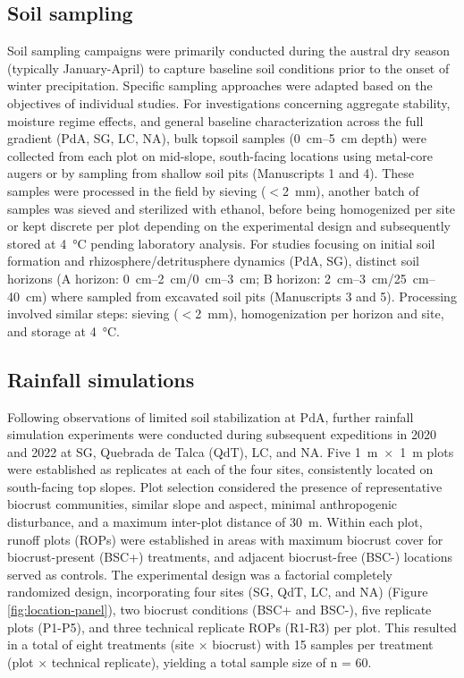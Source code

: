 \FloatBarrier

\subsection{Soil sampling}

Soil sampling campaigns were primarily conducted during the austral dry season (typically January-April) to capture baseline soil conditions prior to the onset of winter precipitation. Specific sampling approaches were adapted based on the objectives of individual studies. For investigations concerning aggregate stability, moisture regime effects, and general baseline characterization across the full gradient (PdA, SG, LC, NA), bulk topsoil samples (\SIrange{0}{5}{\centi\metre} depth) were collected from each plot on mid-slope, south-facing locations using metal-core augers or by sampling from shallow soil pits (Manuscripts 1 and 4). These samples were processed in the field by sieving ($<$\SI{2}{\milli\metre}), another batch of samples was sieved and sterilized with ethanol, before being homogenized per site or kept discrete per plot depending on the experimental design and subsequently stored at \SI{4}{\celsius} pending laboratory analysis. For studies focusing on initial soil formation and rhizosphere/detritusphere dynamics (PdA, SG), distinct soil horizons (A horizon: \SIrange{0}{2}{\centi\meter}/\SIrange{0}{3}{\centi\meter}; B horizon: \SIrange{2}{3}{\centi\meter}/\SIrange{25}{40}{\centi\meter}) where sampled from excavated soil pits (Manuscripts 3 and 5). Processing involved similar steps: sieving ($<$\SI{2}{\milli\metre}), homogenization per horizon and site, and storage at \SI{4}{\celsius}.

\subsection{Rainfall simulations}

Following observations of limited soil stabilization at PdA, further rainfall simulation experiments were conducted during subsequent expeditions in 2020 and 2022 at SG, Quebrada de Talca (QdT), LC, and NA. Five \SI{1}{\meter}~$\times$~\SI{1}{\meter} plots were established as replicates at each of the four sites, consistently located on south-facing top slopes. Plot selection considered the presence of representative biocrust communities, similar slope and aspect, minimal anthropogenic disturbance, and a maximum inter-plot distance of \SI{30}{\meter}. Within each plot, runoff plots (ROPs) were established in areas with maximum biocrust cover for biocrust-present (BSC+) treatments, and adjacent biocrust-free (BSC-) locations served as controls. The experimental design was a factorial completely randomized design, incorporating four sites (SG, QdT, LC, and NA) (Figure \ref{fig:location-panel}), two biocrust conditions (BSC+ and BSC-), five replicate plots (P1-P5), and three technical replicate ROPs (R1-R3) per plot. This resulted in a total of eight treatments (site × biocrust) with 15 samples per treatment (plot $\times$ technical replicate), yielding a total sample size of n = 60.

